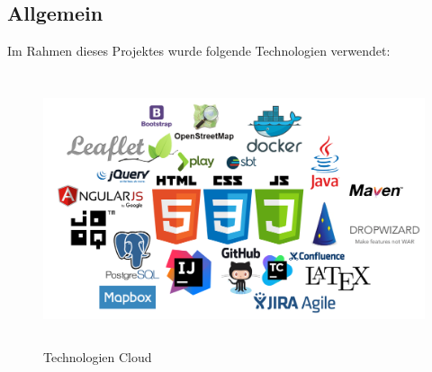 \subsection*{Allgemein}
Im Rahmen dieses Projektes wurde folgende Technologien verwendet:\\
\begin{figure}[H]
\centering
\includegraphics[height=8cm]{images/cloud.png}
\caption{Technologien Cloud}
\label{fig:mainviewpartialview}
\end{figure}
\noindent